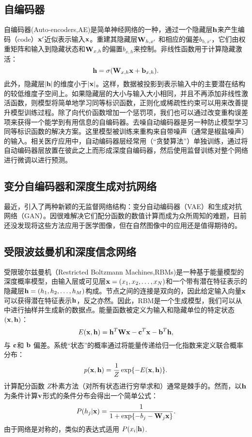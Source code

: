 \subsection{自编码器}
自编码器(Auto-encoders,AE)是简单神经网络的一种，通过一个隐藏层${\bf h}$来产生编码（code）${\bf x}'$近似表示输入${\bf x}$。重建其隐藏层${\bf W}_{h, x'}$ 和相应的偏差$b_{h, x'}$，它们由权重矩阵和输入到隐藏状态和${\bf W}_{x, h}$的偏置$b_{x, h}$来控制。非线性函数用于计算隐藏激活： 
\begin{equation}
\label{eq::ae_projection}
 {\bf h} = \sigma({\bf W}_{x, h} {\bf x} + {\bf b}_{x, h}).
\end{equation}
此外，隐藏层$|{\bf h}|$的维度小于$|{\bf x}|$。这样，数据被投影到表示输入中的主要潜在结构的较低维度子空间上。如果隐藏层的大小与输入大小相同，并且不再添加非线性激活函数，则模型将简单地学习同等标识函数，正则化或稀疏性约束可以用来改善提升模型训练过程。除了向代价函数增加一个惩罚项，我们也可以通过改变重构误差项来获得一个能学到有用信息的自编码器。去噪自动编码器\citep{Vincent2010Stacked}是另一种防止模型学习同等标识函数的解决方案。这里模型被训练来重构来自带噪声（通常是椒盐噪声）的输入。相关医疗应用中，自动编码器层经常用（“贪婪算法”）单独训练，通过将自动编码器层放置在彼此之上而形成深度自编码器，然后使用监督训练对整个网络进行微调以进行预测。

\subsection{变分自编码器和深度生成对抗网络}
最近，引入了两种新颖的无监督网络结构：变分自动编码器（VAE）\citep{Kingma2013Auto}和生成对抗网络（GAN）\citep{Goodfellow2014Generative}。因很难解决它们配分函数的数值计算而成为众所周知的难题，目前还没发现将这些方法应用于医学图像，但在自然图像中的应用还是值得期待的。

\subsection{受限波兹曼机和深度信念网络}
受限玻尔兹曼机（Restricted Boltzmann Machines,RBMs)\citep{Hinton2006a}是一种基于能量模型的深度概率模型，由输入层或可见层${\bf x} = (x_{1}, x_{2}, \ldots, x_{N})$和一个带有潜在特征表示的隐藏层${\bf h} = (h_{1}, h_{2}, \ldots, h_{M})$构成。节点之间的连接是双向的，因此给定输入向量$\bf x$可以获得潜在特征表示$\bf h$，反之亦然。因此，RBM是一个生成模型，我们可以从中进行抽样并生成新的数据点。能量函数被定义为输入和隐藏单位的特定状态$({\bf x}, {\bf h})$：
\begin{equation}
 E({\bf x}, {\bf h}) = {\bf h}^{T}{\bf W}{\bf x} - {\bf c}^{T}{\bf x} - {\bf b}^{T}{\bf h},
\end{equation}
与 ${\bf c}$和 ${\bf b}$ 偏差。系统“状态”的概率通过将能量传递给归一化指数来定义联合概率分布：
\begin{equation}
 p({\bf x}, {\bf h}) = \frac{1}{Z} \exp\{ - E({\bf x}, {\bf h}) \}.
\end{equation}
计算配分函数 $Z$朴素方法（对所有状态进行穷举求和）通常是棘手的。然而，以${\bf h}$为条件计算${\bf v}$形式的条件分布会得出一个简单公式：
\begin{equation}
 P(h_{j} | {\bf x}) = \frac{1}{ 1 + \exp\{ -b_{j} - {\bf W}_{j}{\bf x}\} }.
\end{equation}
由于网络是对称的，类似的表达式适用 $P(x_{i} | {\bf h})$.

